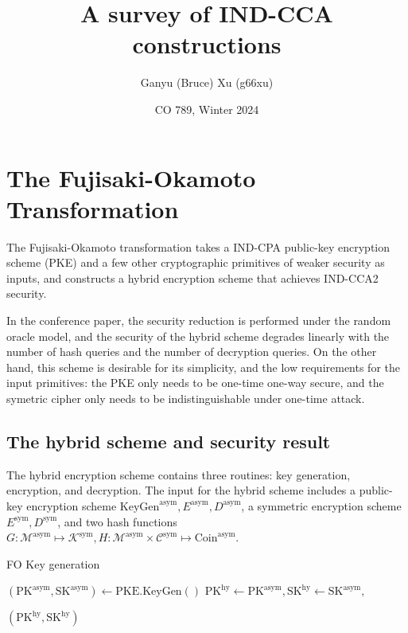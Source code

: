 \documentclass{article}
\title{A survey of IND-CCA constructions}
\author{Ganyu (Bruce) Xu (g66xu)}
\date{CO 789, Winter 2024}
\begin{document}
\maketitle

\section{The Fujisaki-Okamoto Transformation}
The Fujisaki-Okamoto transformation \cite{fujisaki1999secure} takes a IND-CPA public-key encryption scheme (PKE) and a few other cryptographic primitives of weaker security as inputs, and constructs a hybrid encryption scheme that achieves IND-CCA2 security.

In the conference paper, the security reduction is performed under the random oracle model, and the security of the hybrid scheme degrades linearly with the number of hash queries and the number of decryption queries. On the other hand, this scheme is desirable for its simplicity, and the low requirements for the input primitives: the PKE only needs to be one-time one-way secure, and the symetric cipher only needs to be indistinguishable under one-time attack.


\subsection{The hybrid scheme and security result}
The hybrid encryption scheme contains three routines: key generation, encryption, and decryption. The input for the hybrid scheme includes a public-key encryption scheme $\text{KeyGen}^\text{asym}, E^\text{asym}, D^\text{asym}$, a symmetric encryption scheme $E^\text{sym}, D^\text{sym}$, and two hash functions $G: \mathcal{M}^\text{asym} \mapsto \mathcal{K}^\text{sym}, H: \mathcal{M}^\text{asym} \times \mathcal{C}^\text{sym} \mapsto \text{Coin}^\text{asym}$.

\begin{algorithm}
\caption{FO Key generation}\label{fo-key-gen}
\begin{algorithmic}[1]  %
    \State $
        (\text{PK}^\text{asym}, \text{SK}^\text{asym}) 
        \leftarrow \text{PKE.KeyGen}()
    $
    \State $
        \text{PK}^\text{hy} \leftarrow \text{PK}^\text{asym},
        \text{SK}^\text{hy} \leftarrow \text{SK}^\text{asym},
    $

    \Return $(\text{PK}^\text{hy}, \text{SK}^\text{hy})$
\end{algorithmic}
\end{algorithm}
\end{document}
